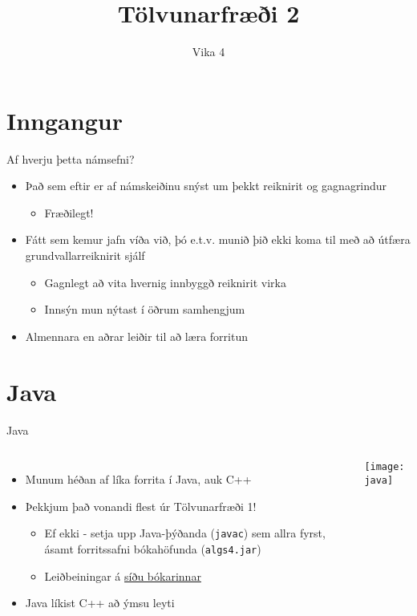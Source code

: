\documentclass{beamer}
\title{Tölvunarfræði 2}
\subtitle{Vika 4}
\begin{document}
\begin{frame}
\titlepage
\end{frame}

\section{Inngangur}

\begin{frame}{Af hverju þetta námsefni?}
\begin{itemize}
 \item Það sem eftir er af námskeiðinu snýst um þekkt reiknirit  og gagnagrindur 
 \begin{itemize}
  \item Fræðilegt!
 \end{itemize}
 \item Fátt sem kemur jafn víða við, þó e.t.v. munið þið ekki koma til með að útfæra grundvallarreiknirit sjálf
 \begin{itemize}
  \item Gagnlegt að vita hvernig innbyggð reiknirit virka
  \item Innsýn mun nýtast í öðrum samhengjum
 \end{itemize}
 \item Almennara en aðrar leiðir til að læra forritun
\end{itemize}
\end{frame}

\section{Java}

\begin{frame}{Java}
\begin{columns}
\begin{itemize}
 \item Munum héðan af líka forrita í Java, auk C++
 \item Þekkjum það vonandi flest úr Tölvunarfræði 1!
 \begin{itemize}
  \item Ef ekki - setja upp Java-þýðanda (\texttt{javac}) sem allra fyrst, ásamt forritssafni bókahöfunda (\texttt{algs4.jar})
  \item Leiðbeiningar á \href{http://algs4.cs.princeton.edu/code/}{síðu bókarinnar}
 \end{itemize}
 \item Java líkist C++ að ýmsu leyti
\end{itemize}
\begin{center}
\texttt{[image: java]}
\end{center}
\end{columns}
\end{frame}
\end{document}
